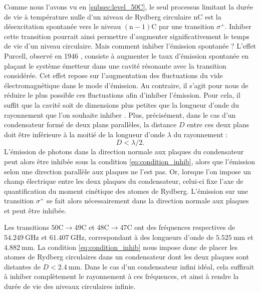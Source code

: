 Comme nous l'avons vu en \ref{subsec:level_50C}, le seul processus limitant la durée de vie à température nulle d'un niveau de Rydberg circulaire $\mathrm{nC}$ est la désexcitation spontanée vers le niveau $\mathrm{(n-1)C}$ par une transition $\sigma^+$.
Inhiber cette transition pourrait ainsi permettre d'augmenter significativement le temps de vie d'un niveau circulaire.
Mais comment inhiber l'émission spontanée ?
L'effet Purcell, observé en 1946 \cite{Purcell46_Purcelleffect}, consiste à augmenter le taux d'émission spontanée en plaçant le système émetteur dans une cavité résonante avec la transition considérée.
Cet effet repose sur l'augmentation des fluctuations du vide électromagnétique dans le mode d'émission.
Au contraire, il s'agit pour nous de réduire le plus possible ces fluctuations afin d'inhiber l'émission.
Pour cela, il suffit que la cavité soit de dimensions plus petites que la longueur d'onde du rayonnement que l'on souhaite inhiber \cite{MX_KELPPNER_INHIBITION,MX_KLEPPNERINHIBITION85}.
Plus, précisément, dans le cas d'un condensateur formé de deux plans parallèles, la distance $D$ entre ces deux plans doit être inférieure à la moitié de la longueur d'onde $\lambda$ du rayonnement :
%
\begin{equation}
\label{eq:condition_inhib}
D< \lambda/2.
\end{equation}
%
L'émission de photons dans la direction normale aux plaques du condensateur peut alors être inhibée sous la condition \eqref{eq:condition_inhib}, alors que l'émission selon une direction parallèle aux plaques ne l'est pas.
Or, lorsque l'on impose un champ électrique entre les deux plaques du condensateur, celui-ci fixe l'axe de quantification du moment cinétique des atomes de Rydberg.
L'émission sur une transition $\sigma^+$ se fait alors nécessairement dans la direction normale aux plaques et peut être inhibée.

Les transitions $\mathrm{50C}\rightarrow \mathrm{49C}$ et $\mathrm{48C}\rightarrow \mathrm{47C}$ ont des fréquences respectives de $\SI{54.249}{\GHz}$ et $\SI{61.407}{\GHz}$, correspondant à des longueurs d'onde de $\SI{5.525}{\mm}$ et $\SI{4.882}{\mm}$.
La condition \eqref{eq:condition_inhib} nous impose donc de placer les atomes de Rydberg circulaires dans un condensateur dont les deux plaques sont distantes de $D<\SI{2.4}{\mm}$.
Dans le cas d'un condensateur infini idéal, cela suffirait à inhiber complètement le rayonnement à ces fréquences, et ainsi à rendre la durée de vie des niveaux circulaires infinie.

